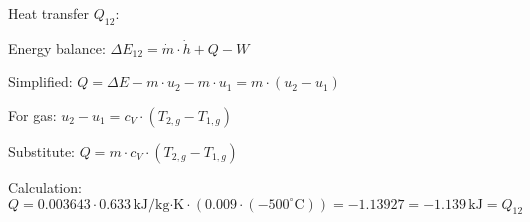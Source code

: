 Heat transfer \( Q_{12} \):  

Energy balance:  
\( \Delta E_{12} = \dot{m} \cdot \dot{h} + Q - W \)  

Simplified:  
\( Q = \Delta E - m \cdot u_2 - m \cdot u_1 = m \cdot (u_2 - u_1) \)  

For gas:  
\( u_2 - u_1 = c_V \cdot (T_{2,g} - T_{1,g}) \)  

Substitute:  
\( Q = m \cdot c_V \cdot (T_{2,g} - T_{1,g}) \)  

Calculation:  
\( Q = 0.003643 \cdot 0.633 \, \text{kJ/kg·K} \cdot (0.009 \cdot (-500^\circ \text{C})) = -1.13927 = -1.139 \, \text{kJ} = Q_{12} \)